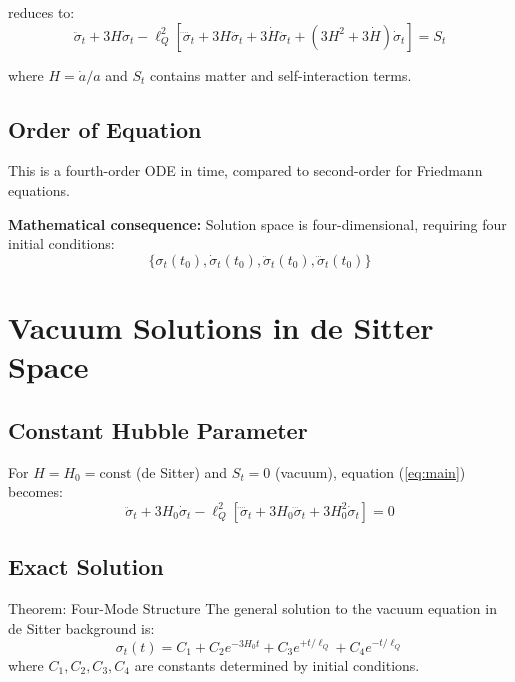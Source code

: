 \documentclass[11pt,a4paper]{article}
\theoremstyle{definition}
\theoremstyle{remark}
\begin{document}
	reduces to:
	\begin{equation}\label{eq:main}
		\ddot{\sigma}_t + 3H\dot{\sigma}_t - \ell_Q^2\left[\ddddot{\sigma}_t + 3H\dddot{\sigma}_t + 3\dot{H}\ddot{\sigma}_t + (3H^2 + 3\dot{H})\dot{\sigma}_t\right] = S_t
	\end{equation}
	
	where $H = \dot{a}/a$ and $S_t$ contains matter and self-interaction terms.
	
	\subsection{Order of Equation}
	
	This is a fourth-order ODE in time, compared to second-order for Friedmann equations.
	
	\textbf{Mathematical consequence:} Solution space is four-dimensional, requiring four initial conditions:
	\begin{equation}
		\{\sigma_t(t_0), \dot{\sigma}_t(t_0), \ddot{\sigma}_t(t_0), \dddot{\sigma}_t(t_0)\}
	\end{equation}
	
	\section{Vacuum Solutions in de Sitter Space}
	
	\subsection{Constant Hubble Parameter}
	
	For $H = H_0 = \text{const}$ (de Sitter) and $S_t = 0$ (vacuum), equation (\ref{eq:main}) becomes:
	\begin{equation}
		\ddot{\sigma}_t + 3H_0\dot{\sigma}_t - \ell_Q^2\left[\ddddot{\sigma}_t + 3H_0\dddot{\sigma}_t + 3H_0^2\dot{\sigma}_t\right] = 0
	\end{equation}
	
	\subsection{Exact Solution}
	
	Theorem: Four-Mode Structure
		The general solution to the vacuum equation in de Sitter background is:
		\begin{equation}\label{eq:four_modes}
			\sigma_t(t) = C_1 + C_2 e^{-3H_0 t} + C_3 e^{+t/\ell_Q} + C_4 e^{-t/\ell_Q}
		\end{equation}
		where $C_1, C_2, C_3, C_4$ are constants determined by initial conditions.
	
\end{document}
